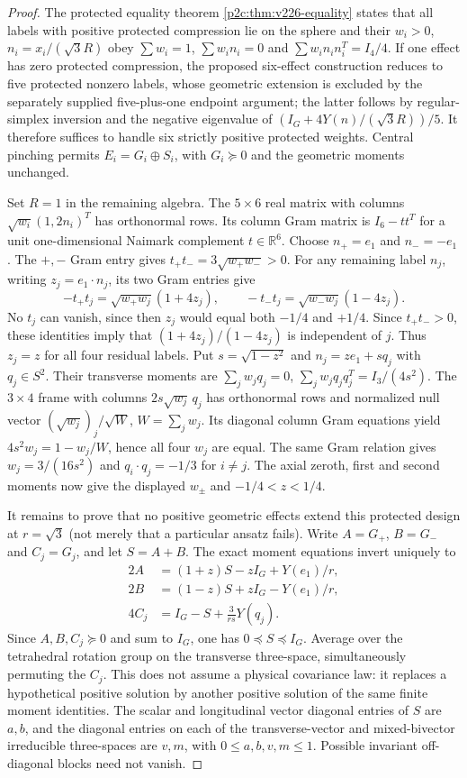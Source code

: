 \documentclass[12pt,a4paper]{article}
\begin{document}
\begin{proof}
The protected equality theorem
\ref{p2c:thm:v226-equality} states that all labels with positive protected
compression lie on the sphere and their $w_i>0$, $n_i=x_i/(\sqrt3R)$
obey $\sum w_i=1$, $\sum w_i n_i=0$ and
$\sum w_i n_i n_i^T=I_4/4$. If one effect has zero protected
compression, the proposed six-effect construction reduces to five
protected nonzero labels, whose geometric extension is excluded by the
separately supplied five-plus-one endpoint argument; the latter follows
by regular-simplex inversion and the negative eigenvalue of
$(I_G+4Y(n)/(\sqrt3R))/5$. It therefore suffices to handle six
strictly positive protected weights. Central pinching permits
$E_i=G_i\oplus S_i$, with $G_i\succeq0$ and the geometric moments
unchanged.

Set $R=1$ in the remaining algebra. The $5\times6$ real matrix with
columns $\sqrt{w_i}(1,2n_i)^T$ has orthonormal rows. Its column Gram
matrix is $I_6-tt^T$ for a unit one-dimensional Naimark complement
$t\in\mathbb R^6$. Choose $n_+=e_1$ and $n_-=-e_1$. The $+,-$
Gram entry gives $t_+t_-=3\sqrt{w_+w_-}>0$.
For any remaining label $n_j$, writing $z_j=e_1\cdot n_j$, its two
Gram entries give
\[
 -t_+t_j=\sqrt{w_+w_j}(1+4z_j),\qquad
 -t_-t_j=\sqrt{w_-w_j}(1-4z_j).
\]
No $t_j$ can vanish, since then $z_j$ would equal both $-1/4$
and $+1/4$. Since $t_+t_->0$, these identities imply that
$(1+4z_j)/(1-4z_j)$ is independent of $j$. Thus $z_j=z$ for all
four residual labels. Put $s=\sqrt{1-z^2}$ and
$n_j=z e_1+s q_j$ with $q_j\in S^2$. Their transverse moments are
$\sum_j w_jq_j=0$, $\sum_jw_j q_j q_j^T=I_3/(4s^2)$.
The $3\times4$ frame with columns $2s\sqrt{w_j}\,q_j$ has
orthonormal rows and normalized null vector
$(\sqrt{w_j})_j/\sqrt{W}$, $W=\sum_jw_j$. Its diagonal column
Gram equations yield $4s^2w_j=1-w_j/W$, hence all four $w_j$
are equal. The same Gram relation gives
$w_j=3/(16s^2)$ and $q_i\cdot q_j=-1/3$ for $i\ne j$.
The axial zeroth, first and second moments now give the displayed
$w_\pm$ and $-1/4<z<1/4$.

It remains to prove that no positive geometric effects extend this
protected design at $r=\sqrt3$ (not merely that a particular ansatz
fails). Write $A=G_+$, $B=G_-$ and $C_j=G_j$, and let $S=A+B$.
The exact moment equations invert uniquely to
\[
 \begin{aligned}
 2A&=(1+z)S-zI_G+Y(e_1)/r,\\
 2B&=(1-z)S+zI_G-Y(e_1)/r,\\
 4C_j&=I_G-S+\frac3{rs}Y(q_j).
 \end{aligned}
\]
Since $A,B,C_j\succeq0$ and sum to $I_G$, one has
$0\preceq S\preceq I_G$.
Average over the tetrahedral rotation group on the transverse
three-space, simultaneously permuting the $C_j$. This does not assume
a physical covariance law: it replaces a hypothetical positive
solution by another positive solution of the same finite moment
identities. The scalar and longitudinal vector diagonal entries of $S$
are $a,b$, and the diagonal entries on each of the transverse-vector
and mixed-bivector irreducible three-spaces are $v,m$, with
$0\le a,b,v,m\le1$. Possible invariant off-diagonal blocks need
not vanish.


\end{proof}
\end{document}
